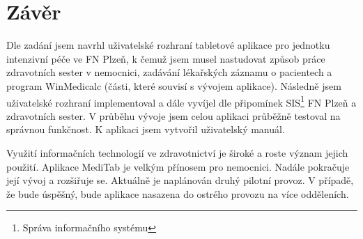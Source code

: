 \setlength{\parskip}{1em}

\chapter*{Závěr}

Dle zadání jsem navrhl uživatelské rozhraní tabletové aplikace pro jednotku intenzivní péče ve FN Plzeň, k čemuž jsem musel nastudovat způsob práce zdravotních sester v nemocnici, zadávání lékařských záznamu o pacientech a program WinMedicalc (části, které souvisí s vývojem aplikace). Následně jsem uživatelské rozhraní implementoval a dále vyvíjel dle připomínek SIS\footnote{Správa informačního systému} FN Plzeň a zdravotních sester. V průběhu vývoje jsem celou aplikaci průběžně testoval na správnou funkčnost. K aplikaci jsem vytvořil uživatelský manuál.

Využití informačních technologií ve zdravotnictví je široké a roste význam jejich použití. Aplikace MediTab je velkým přínosem pro nemocnici. Nadále pokračuje její vývoj a rozšiřuje se. Aktuálně je naplánován druhý pilotní provoz. V případě, že bude úspěšný, bude aplikace nasazena do ostrého provozu na více odděleních.